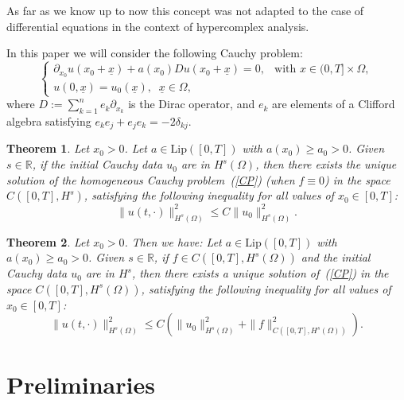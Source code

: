 \documentclass[12pt]{amsart}
\newtheorem{theorem}{Theorem}[section]
\theoremstyle{definition}
\newcommand{\un}{\underline}
\begin{document}
As far as we know up to now this concept was not adapted to the case of differential equations in the context of hypercomplex analysis.

In this paper we will consider the following Cauchy problem:
\begin{equation}
  \begin{cases}
\partial_{x_0} u(x_0+\un{x}) + a(x_0)D u(x_0+\un{x}) = 0, & \text{with } x \in (0, T]\times\Omega, \\
u(0,\un{x}) = u_0(\un{x}),\;\; \un{x}\in \Omega,
\end{cases}
\label{CP}  
\end{equation}
where $D := \sum_{k=1}^n e_k \partial_{x_k}$ is the Dirac operator, and $e_k$ are elements of a Clifford algebra satisfying $e_k e_j + e_j e_k = -2\delta_{kj}$.

\begin{theorem}
\label{th1.1}
Let \(x_0 > 0\). Let \(a \in \mathrm{Lip}([0, T])\) with \(a(x_0) \geq a_0 > 0\). Given \(s \in \mathbb{R}\), if the initial Cauchy data \(u_0\) are in \(H^{s}(\Omega)\), then there exists the unique solution of the homogeneous Cauchy problem~(\ref{CP}) (when \(f \equiv 0\)) in the space \(C([0, T], H^{s})\), satisfying the following inequality for all values of \(x_0 \in [0, T]\):
    \begin{equation*}
    \label{eq:1.5}
          \| u(t, \cdot) \|_{H^s(\Omega)}^2  \leq C \| u_0 \|_{H^s(\Omega)}^2 .
    \end{equation*}
\end{theorem}

\begin{theorem}
\label{th1.2}
Let \(x_0 > 0\). Then we have:
Let \(a \in \mathrm{Lip}([0, T])\) with \(a(x_0) \geq a_0 > 0\). Given \(s \in \mathbb{R}\), if \(f \in C([0, T], H^{s}(\Omega))\) and the initial Cauchy data \(u_0\) are in \(H^s\), then there exists a unique solution of~(\ref{CP}) in the space \(C([0, T], H^s(\Omega))\), satisfying the following inequality for all values of \(x_0 \in [0, T]\):
    \begin{equation}
    \label{eq:1.6}
    \| u(t, \cdot) \|_{H^s(\Omega)}^2  \leq C\left(\| u_0 \|_{H^s(\Omega)}^2+\| f\|_{C([0, T], H^{s}(\Omega))}^2\right).
   \end{equation}
\end{theorem}

\section{Preliminaries}
\end{document}

